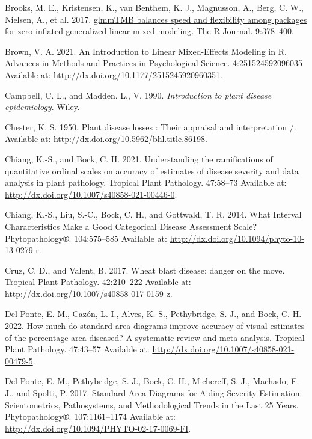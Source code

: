 \documentclass[
  letterpaper,
  DIV=11,
  numbers=noendperiod]{scrreprt}
\newlength{\cslhangindent}
\newlength{\cslentryspacingunit} %
\newenvironment{CSLReferences}[2] %
 {%
  \setlength{\parindent}{0pt}
  \ifodd #1
  \let\oldpar\par
  \def\par{\hangindent=\cslhangindent\oldpar}
  \fi
  \setlength{\parskip}{#2\cslentryspacingunit}
 }%
 {}
\begin{document}
\begin{CSLReferences}{0}{0}
\leavevmode{}%
Brooks, M. E., Kristensen, K., van Benthem, K. J., Magnusson, A., Berg,
C. W., Nielsen, A., et al. 2017.
\href{https://doi.org/10.32614/RJ-2017-066}{{glmmTMB} balances speed and
flexibility among packages for zero-inflated generalized linear mixed
modeling}. The R Journal. 9:378--400.

\leavevmode{}%
Brown, V. A. 2021. An Introduction to Linear Mixed-Effects Modeling in
R. Advances in Methods and Practices in Psychological Science.
4:251524592096035 Available at:
\url{http://dx.doi.org/10.1177/2515245920960351}.

\leavevmode{}%
Campbell, C. L., and Madden. L., V. 1990. \emph{Introduction to plant
disease epidemiology}. Wiley.

\leavevmode{}%
Chester, K. S. 1950. Plant disease losses : Their appraisal and
interpretation /. Available at:
\url{http://dx.doi.org/10.5962/bhl.title.86198}.

\leavevmode{}%
Chiang, K.-S., and Bock, C. H. 2021. Understanding the ramifications of
quantitative ordinal scales on accuracy of estimates of disease severity
and data analysis in plant pathology. Tropical Plant Pathology.
47:58--73 Available at:
\url{http://dx.doi.org/10.1007/s40858-021-00446-0}.

\leavevmode{}%
Chiang, K.-S., Liu, S.-C., Bock, C. H., and Gottwald, T. R. 2014. What
Interval Characteristics Make a Good Categorical Disease Assessment
Scale? Phytopathology®. 104:575--585 Available at:
\url{http://dx.doi.org/10.1094/phyto-10-13-0279-r}.

\leavevmode{}%
Cruz, C. D., and Valent, B. 2017. Wheat blast disease: danger on the
move. Tropical Plant Pathology. 42:210--222 Available at:
\url{http://dx.doi.org/10.1007/s40858-017-0159-z}.

\leavevmode{}%
Del Ponte, E. M., Cazón, L. I., Alves, K. S., Pethybridge, S. J., and
Bock, C. H. 2022. How much do standard area diagrams improve accuracy of
visual estimates of the percentage area diseased? A systematic review
and meta-analysis. Tropical Plant Pathology. 47:43--57 Available at:
\url{http://dx.doi.org/10.1007/s40858-021-00479-5}.

\leavevmode{}%
Del Ponte, E. M., Pethybridge, S. J., Bock, C. H., Michereff, S. J.,
Machado, F. J., and Spolti, P. 2017. Standard Area Diagrams for Aiding
Severity Estimation: Scientometrics, Pathosystems, and Methodological
Trends in the Last 25 Years. Phytopathology®. 107:1161--1174 Available
at: \url{http://dx.doi.org/10.1094/PHYTO-02-17-0069-FI}.


\end{CSLReferences}
\end{document}
